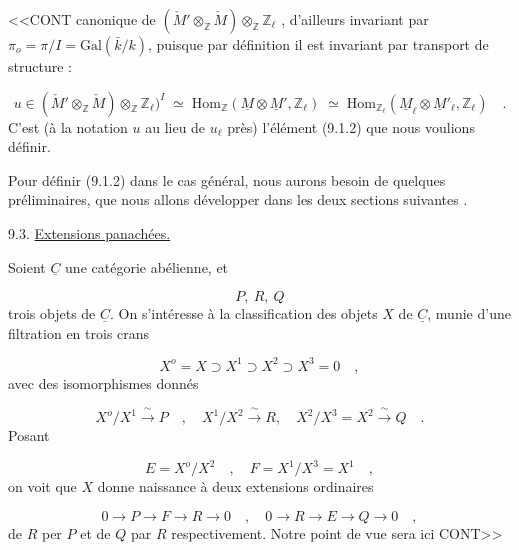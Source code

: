
<<CONT canonique de $(\check{M}'\otimes_{\mathbb{Z}}\check{M})\otimes_{\mathbb{Z}}\mathbb{Z}_\ell$ , d'ailleurs invariant par $\pi_o=\pi/I=\mathrm{Gal}(\bar{k}/k)$, puisque par définition il est invariant par transport de structure :

\begin{equation}\tag{9.2.9}
u \in (\check{M}'\otimes_{\mathbb{Z}}\check{M})\otimes_{\mathbb{Z}}\mathbb{Z}_\ell)^I \;\simeq\; \mathrm{Hom}_{\mathbb{Z}}(\underline{M}\otimes\underline{M}',\mathbb{Z}_\ell) \;\simeq\; \mathrm{Hom}_{\mathbb{Z}_\ell}(\underline{M}_\ell\otimes\underline{M}'_\ell,\mathbb{Z}_\ell) \quad .
\end{equation}
C'est (à la notation $u$ au lieu de $u_\ell$ près) l'élément (9.1.2) que nous voulions définir.

Pour définir (9.1.2) dans le cas général, nous aurons besoin de quelques préliminaires, que nous allons développer dans les deux sections suivantes .


9.3. \underline{Extensions panachées.}

Soient $\underline{C}$ une catégorie abélienne, et

\begin{equation}\tag{9.3.1}
P,\ R,\ Q
\end{equation}
trois objets de $\underline{C}$. On s'intéresse à la classification des objets $X$ de $\underline{C}$, munie d'une filtration en trois crans

\begin{equation}\tag{*}
X^o = X \supset X^1 \supset X^2 \supset X^3 = 0 \quad ,
\end{equation}
avec des isomorphismes donnés

\begin{equation*}
X^o/X^1 \xrightarrow{\ \sim\ } P \quad , \quad X^1/X^2 \xrightarrow{\ \sim\ } R, \quad X^2/X^3 = X^2 \xrightarrow{\ \sim\ } Q \quad .
\end{equation*}
Posant

\begin{equation*}
E = X^o/X^2 \quad , \quad F = X^1/X^3 = X^1 \quad ,
\end{equation*}
on voit que $X$ donne naissance à deux extensions ordinaires

\begin{equation}\tag{9.3.2}
0 \longrightarrow P \longrightarrow F \longrightarrow R \longrightarrow 0 \quad , \quad 0 \longrightarrow R \longrightarrow E \longrightarrow Q \longrightarrow 0 \quad ,
\end{equation}
de $R$ per $P$ et de $Q$ par $R$ respectivement. Notre point de vue sera ici CONT>>


